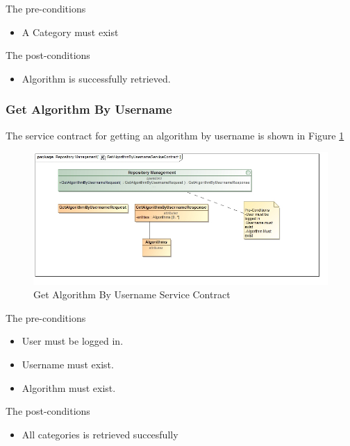 The pre-conditions
\begin{itemize}
  \item A Category must exist
\end{itemize}

The post-conditions
\begin{itemize}
  \item Algorithm is successfully retrieved.
\end{itemize}

\subsubsection{Get Algorithm By Username}
The service contract for getting an algorithm by username is shown in Figure \ref{fig:getAlgorithmByUsername}
\begin{figure}[H]
	\begin{center}
		\includegraphics[scale=0.6]{../Diagrams and Charts/Test Data/GetAlgorithmByUsernameServiceContract.jpg}
		\caption{Get Algorithm By Username Service Contract}
		\label{fig:getAlgorithmByUsername}
	\end{center}
	
\end{figure}	

The pre-conditions
\begin{itemize}
	\item User must be logged in.
	\item Username must exist.
	\item Algorithm must exist.
\end{itemize}

The post-conditions
\begin{itemize}
  \item All categories is retrieved succesfully
\end{itemize}


